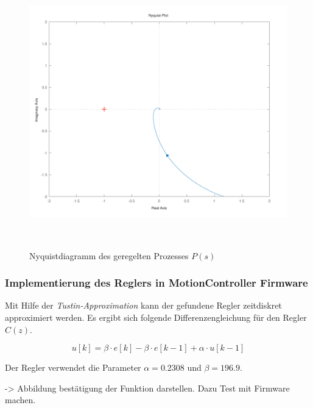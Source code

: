 \documentclass[main.tex]{subfiles} %
\begin{document}
\begin{figure}[H]
    \centering
    \includegraphics[width=0.5\linewidth]{fig_Parametrierung_Linienfolgeregler/NyquistPlot_System_geregelt.pdf}
    \caption{Nyquistdiagramm des geregelten Prozesses $P(s)$}~\label{fig:Nyquist_geregelt}
\end{figure}

\subsubsection*{Implementierung des Reglers in MotionController Firmware}

Mit Hilfe der \textit{Tustin-Approximation} kann der gefundene Regler
zeitdiskret approximiert werden. Es ergibt sich folgende Differenzengleichung
für den Regler $C(z)$.

\[
    u[k] = \beta \cdot e[k] - \beta \cdot e[k - 1] + \alpha \cdot u[k - 1]
\]

Der Regler verwendet die Parameter $\alpha = 0.2308$ und $\beta = 196.9$.

-> Abbildung bestätigung der Funktion darstellen. Dazu Test mit Firmware machen.
\end{document}
